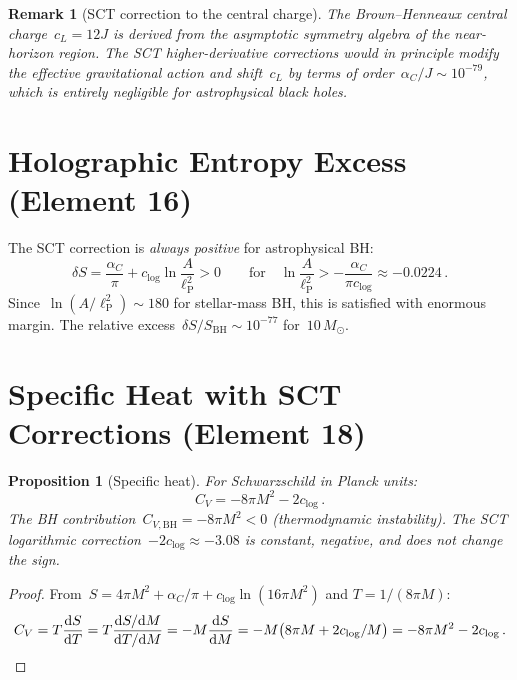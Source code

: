 \documentclass[11pt,a4paper]{article}
\newtheorem{proposition}[theorem]{Proposition}
\newtheorem{remark}{Remark}[section]
\newcommand{\lP}{\ell_{\mathrm{P}}}
\newcommand{\Msun}{M_\odot}
\newcommand{\alpC}{\alpha_C}
\newcommand{\clog}{c_{\log}}
\begin{document}
\begin{remark}[SCT correction to the central charge]
The Brown--Henneaux central charge~$c_L = 12J$ is derived from the
asymptotic symmetry algebra of the near-horizon region.  The SCT
higher-derivative corrections would in principle modify the effective
gravitational action and shift~$c_L$ by terms of
order~$\alpha_C/J \sim 10^{-79}$, which is entirely negligible for
astrophysical black holes.
\end{remark}

\section{Holographic Entropy Excess (Element 16)}\label{sec:holographic}

The SCT correction is \emph{always positive} for astrophysical BH:
\[
  \delta S = \frac{\alpC}{\pi} + \clog\ln\frac{A}{\lP^2} > 0
  \qquad\text{for}\quad \ln\frac{A}{\lP^2} > -\frac{\alpC}{\pi\clog}
    \approx -0.0224\,.
\]
Since~$\ln(A/\lP^2) \sim 180$ for stellar-mass BH, this is satisfied
with enormous margin.  The relative excess~$\delta S/S_{\mathrm{BH}}
\sim 10^{-77}$ for~$10\,\Msun$.

\section{Specific Heat with SCT Corrections (Element 18)}
\label{sec:specific-heat}

\begin{proposition}[Specific heat]\label{prop:cv}
For Schwarzschild in Planck units:
\begin{equation}
  C_V = -8\pi M^2 - 2\clog\,.
\end{equation}
The BH contribution~$C_{V,\mathrm{BH}} = -8\pi M^2 < 0$ (thermodynamic
instability).  The SCT logarithmic correction~$-2\clog \approx -3.08$
is constant, negative, and does not change the sign.
\end{proposition}

\begin{proof}
From~$S = 4\pi M^2 + \alpC/\pi + \clog\ln(16\pi M^2)$ and
$T = 1/(8\pi M)$:
\[
  C_V = T\frac{\dd S}{\dd T}
      = T\frac{\dd S/\dd M}{\dd T/\dd M}
      = -M\frac{\dd S}{\dd M}
      = -M\bigl(8\pi M + 2\clog/M\bigr)
      = -8\pi M^2 - 2\clog\,.\qedhere
\]
\end{proof}
\end{document}
